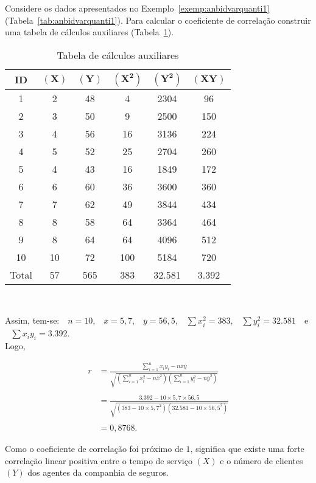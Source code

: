 \documentclass[11pt,fleqn]{book} %
\begin{document}
\begin{example}

Considere os dados apresentados no Exemplo~\ref{exemp:anbidvarquanti1} (Tabela~\ref{tab:anbidvarquanti1}). Para calcular o coeficiente de correlação construir uma tabela de cálculos auxiliares (Tabela~\ref{tab:anbidvarquanti2}).

\begin{table}[h]
	\caption{Tabela de cálculos auxiliares}
	\label{tab:anbidvarquanti2} 
	\vspace{-0.1cm}
	\centering
	\begin{tabular}{c c c c c c}
	\toprule
	\textbf{ID} & \textbf{$\bm{(X)}$} & \textbf{$\bm{(Y)}$} & \textbf{$\bm{(X^2)}$} & \textbf{$\bm{(Y^2)}$} & 
	\textbf{$\bm{(XY)}$}\\
	\midrule
	1 & 2 & 48 & 4 & 2304 & 96 \\
	2 & 3 & 50 & 9 & 2500 & 150 \\
	3 & 4 & 56 & 16 & 3136 & 224 \\
	4 & 5 & 52 & 25 & 2704 & 260 \\
	5 & 4 & 43 & 16 & 1849 & 172 \\
	6 & 6 & 60 & 36 & 3600 & 360 \\
	7 & 7 & 62 & 49 & 3844 & 434 \\
	8 & 8 & 58 & 64 & 3364 & 464 \\
	9 & 8 & 64 & 64 & 4096 & 512 \\
	10 & 10 & 72 & 100 & 5184 & 720 \\
	\midrule
	Total & 57 & 565 & 383 & 32.581 & 3.392 \\
	\bottomrule
	\end{tabular} \\
\end{table}

Assim, tem-se: \,\, $n=10$, \,\, $\bar{x}=5,7$, \,\, $\bar{y}=56,5$, \,\, $\sum x_i^2=383$, \,\, $\sum y_i^2=32.581$ \,\, e \,\, $\sum x_i y_i=3.392$. \\

Logo,

\begin{ceqn}
\begin{align*}
r
&= \displaystyle \frac{\displaystyle\sum_{i=1}^{n}{x_i y_i}-n\bar{x}\bar{y}}
	 {\sqrt{\left(\displaystyle\sum_{i=1}^{n}{x_i^2}-n\bar{x}^2\right)
			\left(\displaystyle\sum_{i=1}^{n}{y_i^2}-n\bar{y}^2\right)}} \\ \\
&= \displaystyle \frac{3.392 - 10 \times 5,7 \times 56,5}
	 {\sqrt{\left( 383 - 10 \times 5,7^2 \right)
			\left( 32.581 - 10 \times 56,5^2 \right)}} \\ \\
&= 0,8768.
\end{align*}
\end{ceqn}


Como o coeficiente de correlação foi próximo de $1$, significa que existe uma forte correlação linear positiva entre o tempo de serviço $(X)$ e o número de clientes $(Y)$ dos agentes da companhia de seguros. \\

\end{example}
\end{document}
